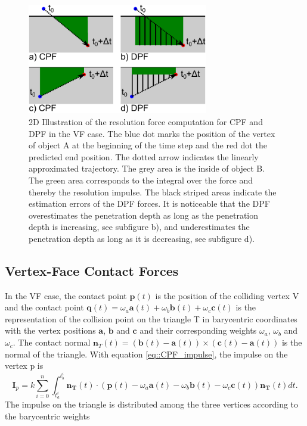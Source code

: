 \begin{figure}[h] 
  \centering
     \includegraphics[width=0.7\textwidth]{pics/pdf/impulseComputationCPFDPF.pdf}
  \caption[2D Illustration of the resolution force computation for CPF and DPF in the VF case.]{2D Illustration of the resolution force computation for CPF and DPF in the VF case. The blue dot marks the position of the vertex of object A at the beginning of the time step and the red dot the predicted end position. The dotted arrow indicates the linearly approximated trajectory. The grey area is the inside of object B. The green area corresponds to the integral over the force and thereby the resolution impulse. The black striped areas indicate the estimation errors of the DPF forces. It is noticeable that the DPF overestimates the penetration depth as long as the penetration depth is increasing, see subfigure b), and underestimates the penetration depth as long as it is decreasing, see subfigure d).}
  \label{fig:impulseComputationCPFDPF}
\end{figure}

 
\subsection{Vertex-Face Contact Forces}
In the VF case, the contact point $\mathbf p(t)$ is the position of the colliding vertex V and  the contact point $\mathbf q(t)=\omega_a \mathbf a(t)+\omega_b \mathbf b(t)+\omega_c \mathbf c(t) $ is the representation of the collision point on the triangle T in barycentric coordinates with the vertex positions $\mathbf a$, $\mathbf b$ and $\mathbf c$ and their corresponding weights $\omega_a$, $\omega_b$ and $\omega_c$. The contact normal $\mathbf n_T(t) = (\mathbf b(t) - \mathbf a(t))\times(\mathbf c(t) - \mathbf a(t))$ is the normal of the triangle. With equation \ref{eq::CPF_impulse}, the impulse on the vertex p is
\begin{equation}
     \mathbf I_p =k \sum\limits_{i=0}^{n}\int_{t_a^i}^{t_b^i} \mathbf{n_T}(t) \cdot   (\mathbf p(t) - \omega_a \mathbf a(t)-\omega_b \mathbf b(t)-\omega_c \mathbf c(t)) \mathbf {n_T} (t)dt.
\end{equation}
The impulse on the triangle is distributed among the three vertices according to the barycentric weights

